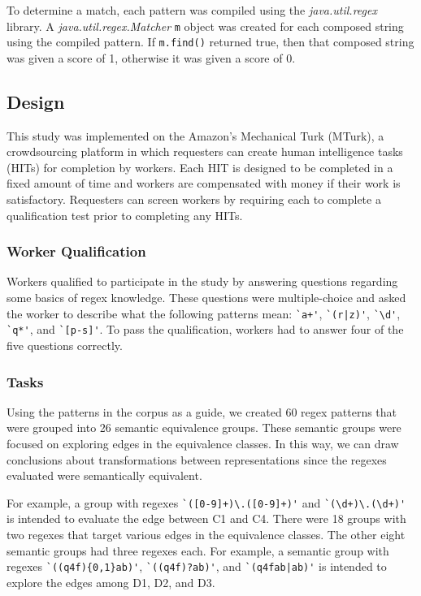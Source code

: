 To determine a match, each pattern was compiled using the \emph{java.util.regex} library. A \emph{java.util.regex.Matcher} \verb!m! object was created for each composed string using the compiled pattern.  If \verb!m.find()! returned true, then that composed string was given a score of 1, otherwise it was given a score of 0.

\subsection{Design}
This study was implemented on the Amazon's Mechanical Turk (MTurk),  a crowdsourcing platform in which requesters can create human intelligence tasks (HITs) for completion by workers. Each HIT is designed to be completed in a fixed amount of time and workers are compensated with money if their work is satisfactory. Requesters can screen workers by requiring each to complete a qualification test prior to completing any HITs.

\subsubsection{Worker Qualification}
Workers qualified to participate in the study by answering questions regarding some basics of regex knowledge. These questions were multiple-choice and asked the worker to describe what the following patterns mean: \verb!`a+'!, \verb!`(r|z)'!, \verb!`\d'!, \verb!`q*'!, and \verb!`[p-s]'!. To pass the qualification, workers had to answer four of the five questions correctly.

\subsubsection{Tasks}
Using the patterns in the corpus as a guide, we created 60 regex patterns that were grouped into 26 semantic equivalence groups.
These semantic groups were focused on exploring edges in the equivalence classes. In this way, we can draw conclusions about transformations between representations since the regexes evaluated were semantically equivalent.

For example, a  group with regexes \verb!`([0-9]+)\.([0-9]+)'! and  \verb!`(\d+)\.(\d+)'! is intended to evaluate the edge between C1 and C4.
There were 18 groups with two regexes that target various edges in the equivalence classes.
The other eight semantic groups had three regexes each.
For example, a semantic group with regexes \verb!`((q4f){0,1}ab)'!, \verb!`((q4f)?ab)'!, and \verb!`(q4fab|ab)'! is intended to explore the edges among D1, D2, and D3.

